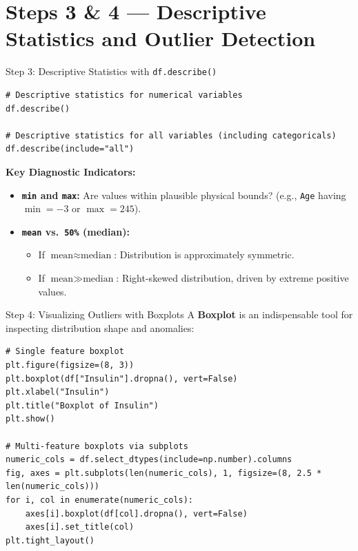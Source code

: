\documentclass[aspectratio=169,11pt]{beamer}
\newcommand{\code}[1]{\texttt{#1}}
\newcommand{\smallgap}{\vspace{0.35em}}
\begin{document}
\section{Steps 3 \& 4 — Descriptive Statistics and Outlier Detection}

\begin{frame}[fragile]{Step 3: Descriptive Statistics with \texttt{df.describe()}}
\begin{lstlisting}[style=pythonstyle]
# Descriptive statistics for numerical variables
df.describe()

# Descriptive statistics for all variables (including categoricals)
df.describe(include="all")
\end{lstlisting}

\smallgap
\textbf{Key Diagnostic Indicators:}
\begin{itemize}
  \item \textbf{\code{min} and \code{max}:} Are values within plausible physical bounds? (e.g., \code{Age} having $\min = -3$ or $\max = 245$).
  \item \textbf{\code{mean} vs.\ \code{50\%} (median):}
  \begin{itemize}
    \item If $\text{mean} \approx \text{median}$: Distribution is approximately symmetric.
    \item If $\text{mean} \gg \text{median}$: Right-skewed distribution, driven by extreme positive values.
  \end{itemize}
\end{itemize}
\end{frame}

\begin{frame}[fragile]{Step 4: Visualizing Outliers with Boxplots}
A \textbf{Boxplot} is an indispensable tool for inspecting distribution shape and anomalies:
\begin{lstlisting}[style=pythonstyle]
# Single feature boxplot
plt.figure(figsize=(8, 3))
plt.boxplot(df["Insulin"].dropna(), vert=False)
plt.xlabel("Insulin")
plt.title("Boxplot of Insulin")
plt.show()

# Multi-feature boxplots via subplots
numeric_cols = df.select_dtypes(include=np.number).columns
fig, axes = plt.subplots(len(numeric_cols), 1, figsize=(8, 2.5 * len(numeric_cols)))
for i, col in enumerate(numeric_cols):
    axes[i].boxplot(df[col].dropna(), vert=False)
    axes[i].set_title(col)
plt.tight_layout()
\end{lstlisting}
\end{frame}
\end{document}
